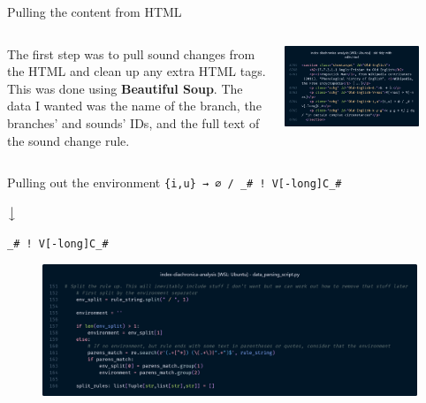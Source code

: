\documentclass[10pt]{beamer}
\begin{document}
  \begin{frame}{Pulling the content from HTML}
    \begin{columns}[c]
      \begin{column}{0.5\textwidth}
        The first step was to pull sound changes from the HTML and clean up any extra HTML tags. This was done using \textbf{Beautiful Soup}. The data I wanted was the name of the branch, the branches' and sounds' IDs, and the full text of the sound change rule.
      \end{column}
      \begin{column}{0.5\textwidth}
        \centering
        \includegraphics[width=0.8\textwidth, height=0.9\textheight, keepaspectratio]{html.png}
      \end{column}
    \end{columns}
  \end{frame}
  \begin{frame}[fragile=singleslide]{Pulling out the environment}
    \centering
    \verb|{i,u} → ∅ / _# ! V[-long]C_#|
    
    \vspace*{5pt}

    $\big\downarrow$

    \vspace*{5pt}

    \verb|_# ! V[-long]C_#|

    \vspace*{5pt}

    \begin{figure}
      \centering
      \includegraphics[width=1\textwidth, height=0.5\textheight, keepaspectratio]{env.png}
    \end{figure}
  \end{frame}
\end{document}
